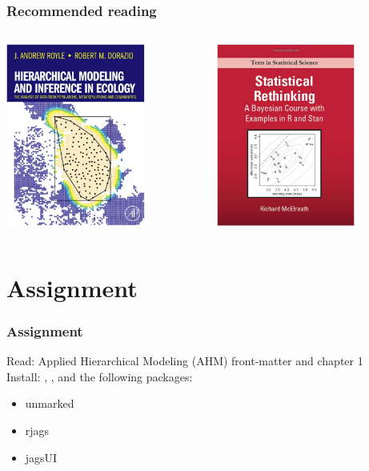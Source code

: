 \documentclass{beamer}\usepackage[]{graphicx}\usepackage[]{color}
\begin{document}
\begin{frame}
  \frametitle{Recommended reading}
  \begin{columns}[c]
    \setlength\fboxsep{0pt}
    \begin{column}{0.5\textwidth}
      \centering
      \includegraphics[height=6cm]{figs/RoyleDorazioBookCover} \\
    \end{column}
    \hfill
    \begin{column}{0.5\textwidth}
      \centering
      \includegraphics[height=6cm]{figs/McElreathBookCover} \\
    \end{column}
  \end{columns}
\end{frame}



\section{Assignment}


\begin{frame}
  \frametitle{Assignment}
  \Large
  Read: Applied Hierarchical Modeling (AHM) front-matter and chapter 1 \\
  \vfill
  Install: \href{https://sourceforge.net/projects/mcmc-jags/files/}{\jags},
  \href{https://www.r-project.org/}{\R}, and the following packages:
  \begin{itemize}
    \tt
    \item unmarked
    \item rjags
    \item jagsUI
  \end{itemize}

\end{frame}
\end{document}
